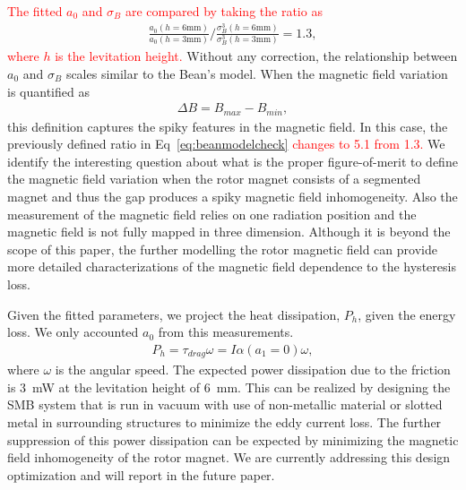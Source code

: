 \documentclass[journal]{IEEEtran}
\def\cred{\textcolor{red}}
\begin{document}
\cred{The fitted $a_0$ and $\sigma_B$ are compared by taking the ratio as}
\begin{eqnarray}
\frac{a_0(h=6\mbox{mm})}{a_0(h=3\mbox{mm})} / \frac{\sigma^3_B(h=6\mbox{mm})}{\sigma^3_B(h=3\mbox{mm})} = 1.3,
\label{eq:beanmodelcheck}
\end{eqnarray}
\cred{where $h$ is the levitation height.}
Without any correction, the relationship between $a_0$ and $\sigma_B$ scales similar to the Bean's model.
When the magnetic field variation is quantified as
\begin{eqnarray}
\Delta B = B_{max} - B_{min},
\label{eq:bmax-bmin}
\end{eqnarray}
this definition captures the spiky features in the magnetic field.
In this case, the previously defined ratio in Eq~\ref{eq:beanmodelcheck} \cred{changes to 5.1 from 1.3.}
We identify the interesting question about what is the proper figure-of-merit to define the magnetic field variation when the rotor magnet consists of a segmented magnet and thus the gap produces a spiky magnetic field inhomogeneity. 
Also the measurement of the magnetic field relies on one radiation position and the magnetic field is not fully mapped in three dimension. 
Although it is beyond the scope of this paper, the further modelling the rotor magnetic field can provide more detailed characterizations of the magnetic field dependence to the hysteresis loss. 

Given the fitted parameters, we project the heat dissipation, $P_{h}$, given the energy loss.
We only accounted $a_0$ from this measurements.
\begin{eqnarray}
P_{h} = \tau_{drag} \omega = I \alpha(a_1=0) \omega,
\label{eq:energyloss}
\end{eqnarray}
where $\omega$ is the angular speed.
The expected power dissipation due to the friction is 3~mW at the levitation height of 6~mm.
This can be realized by designing the SMB system that is run in vacuum with use of non-metallic material or slotted metal in surrounding structures to minimize the eddy current loss.
The further suppression of this power dissipation can be expected by minimizing the magnetic field inhomogeneity of the rotor magnet.
We are currently addressing this design optimization and will report in the future paper.
\end{document}
